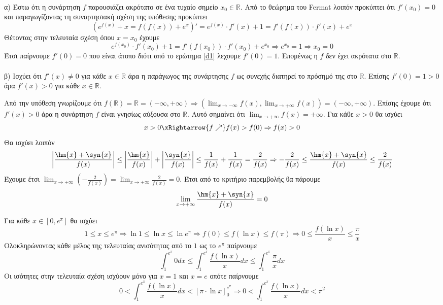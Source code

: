 \documentclass[internet]{diag-pan-xelatex}
\begin{document}
\begin{thema}
\begin{erwthma}
\begin{gather*}
\end{gather*}
\item α) Έστω ότι η συνάρτηση $ f $ παρουσιάζει ακρότατο σε ένα τυχαίο σημείο $ x_0\in\mathbb{R} $. Από το θεώρημα του Fermat λοιπόν προκύπτει ότι $ f'(x_0)=0 $ και παραγωγίζοντας τη συναρτησιακή σχέση της υπόθεσης προκύπτει
\[ \left(e^{f(x)}+x=f(f(x))+e^x\right)'=e^{f(x)}\cdot f'(x)+1=f'(f(x))\cdot f'(x)+e^x  \]
Θέτοντας στην τελευταία σχέση όπου $ x=x_0 $ έχουμε 
\[ e^{f(x_0)}\cdot f'(x_0)+1=f'(f(x_0))\cdot f'(x_0)+e^{x_0}\Rightarrow e^{x_0}=1\Rightarrow x_0=0 \]
Έτσι παίρνουμε $ f'(0)=0 $ που είναι άτοπο διότι από το ερώτημα \ref{d1} λεχουμε $ f'(0)=1 $. Επομένως η $ f $ δεν έχει ακρότατα στο $ \mathbb{R} $.\\\\
β) Ισχύει ότι $ f'(x)\neq0 $ για κάθε $ x\in\mathbb{R} $ άρα η παράγωγος της συνάρτησης $ f $ ως συνεχής διατηρεί το πρόσημό της στο $ \mathbb{R} $. Επίσης $ f'(0)=1>0 $ άρα $ f'(x)>0 $ για κάθε $ x\in\mathbb{R} $.
\item Από την υπόθεση γνωρίζουμε ότι $\displaystyle f(\mathbb{R})=\mathbb{R}=\left(-\infty,+\infty \right)\Rightarrow\left(\lim_{x\to-\infty}{f(x)},\lim_{x\to+\infty}{f(x)} \right)=(-\infty,+\infty)  $. Επίσης έχουμε ότι $ f'(x)>0 $ άρα η συνάρτηση $ f $ είναι γνησίως αύξουσα στο $ \mathbb{R} $. Αυτό σημαίνει ότι $ \displaystyle{\lim_{x\to+\infty}{f(x)}=+\infty} $. Για κάθε $ x>0 $ θα ισχύει
\[ x>0\xRightarrow{f\nearrow}f(x)>f(0)\Rightarrow f(x)>0 \]
Θα ισχύει λοιπόν 
\[ \left|\frac{\hm{x}+\syn{x}}{f(x)} \right|\leq \left|\frac{\hm{x}}{f(x)} \right|+\left|\frac{\syn{x}}{f(x)} \right|\leq \frac{1}{f(x)}+\frac{1}{f(x)}=\frac{2}{f(x)}\Rightarrow -\frac{2}{f(x)}\leq \frac{\hm{x}+\syn{x}}{f(x)}\leq \frac{2}{f(x)} \]
Έχουμε έτσι $ \displaystyle{\lim_{x\to+\infty}{\left(-\frac{2}{f(x)}\right) }=\lim_{x\to+\infty}{\frac{2}{f(x)}}=0} $. Έτσι από το κριτήριο παρεμβολής θα πάρουμε 
\[ \lim_{x\to+\infty}{\frac{\hm{x}+\syn{x}}{f(x)}}=0 \]
\item Για κάθε $ x\in\left[0,e^\pi \right] $ θα ισχύει 
\[ 1\leq x\leq e^\pi\Rightarrow \ln{1}\leq \ln{x}\leq \ln{e^\pi}\Rightarrow f(0)\leq f(\ln{x})\leq f(\pi)\Rightarrow 0\leq \frac{f(\ln{x})}{x}\leq \frac{\pi}{x} \]
Ολοκληρώνοντας κάθε μέλος της τελευταίας ανισότητας από το $ 1 $ ως το $ e^\pi $ παίρνουμε 
\[ \int_{1}^{e^\pi}0dx\leq \int_{1}^{e^\pi}\frac{f(\ln{x})}{x}dx\leq \int_{1}^{e^\pi}\frac{\pi}{x}dx \]
Οι ισότητες στην τελευταία σχέση ισχύουν μόνο για $ x=1 $ και $ x=e $ οπότε παίρνουμε \[ 0< \int_{1}^{e^\pi}\frac{f(\ln{x})}{x}dx< [\pi\cdot\ln{x}]_{0}^{e^\pi}\Rightarrow 0< \int_{1}^{e^\pi}\frac{f(\ln{x})}{x}dx< \pi^2\]
\end{erwthma}
\end{thema}
\end{document}
